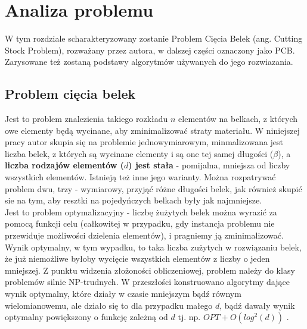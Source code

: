 \chapter{Analiza problemu} \label{ch:CHAPTER_1}
\thispagestyle{chapterBeginStyle}

W tym rozdziale scharakteryzowany zostanie Problem Cięcia Belek (ang. Cutting Stock Problem), rozważany przez autora, w dalszej części oznaczony jako PCB.
Zarysowane też zostaną podstawy algorytmów używanych do jego rozwiazania.

\section{Problem cięcia belek}
Jest to problem znalezienia takiego rozkładu $n$ elementów na belkach, z których owe elementy będą wycinane, aby zminimalizować straty materiału.  W niniejszej pracy autor skupia się na problemie jednowymiarowym, minmalizowana jest liczba belek, z których są wycinane elementy i są one tej samej długości ($\beta$), a \textbf{liczba rodzajów elementów ($d$) jest stała} - pomijalna, mniejsza od liczby wszystkich elementów. Istnieją też inne jego warianty. Można rozpatrywać problem dwu, trzy - wymiarowy, przyjąć różne długości belek, jak również skupić sie na tym, aby resztki na pojedyńczych belkach były jak najmniejsze.\\
Jest to problem optymalizacyjny - liczbę żużytych belek można wyrazić za pomocą funkcji celu (całkowitej w przypadku, gdy instancja problemu nie przewiduje możliwości dzielenia elementów), i pragniemy ją zminimalizować.
Wynik optymalny, w tym wypadku, to taka liczba zużytych w rozwiązaniu belek, że już niemożliwe byłoby wycięcie wszystkich elementów z liczby o jeden mniejszej.
Z punktu widzenia złożoności obliczeniowej, problem należy do klasy problemów silnie NP-trudnych. W przeszłości konstruowano algorytmy dające wynik optymalny, które działy w czasie mniejszym bądź równym wielomianowemu, ale działo się to dla przypadku małego $d$, bądź dawały wynik optymalny powiększony o funkcję zależną od $d$ tj. np. $OPT + O(log^2(d))$  \cite{ALG_OPT_1}.

